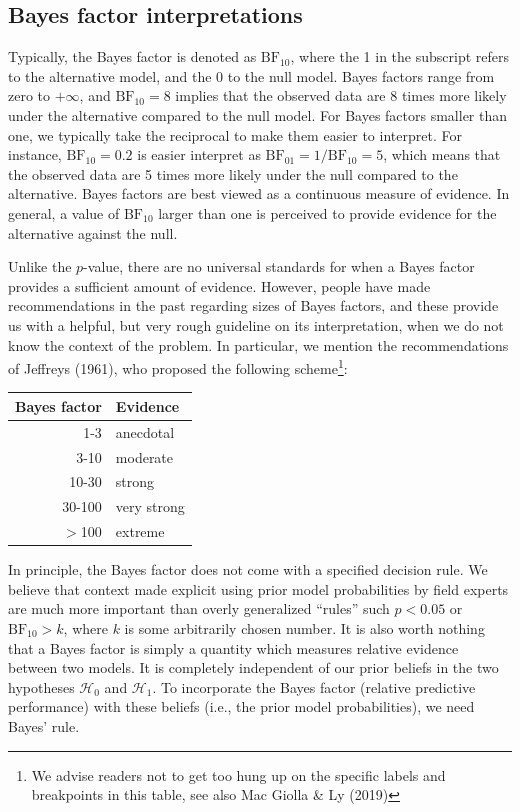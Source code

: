 \documentclass[english,,doc,floatsintext]{apa6}
\let\rmarkdownfootnote\footnote%
\def\footnote{\protect\rmarkdownfootnote}
\begin{document}
\hypertarget{bayes-factor-interpretations}{%
\subsection{Bayes factor interpretations}\label{bayes-factor-interpretations}}

Typically, the Bayes factor is denoted as \(\text{BF}_{10}\), where the 1 in the subscript refers to the alternative model, and the 0 to the null model. Bayes factors range from zero to \(+ \infty\), and \(\text{BF}_{10} = 8\) implies that the observed data are 8 times more likely under the alternative compared to the null model. For Bayes factors smaller than one, we typically take the reciprocal to make them easier to interpret. For instance, \(\text{BF}_{10} = 0.2\) is easier interpret as \(\text{BF}_{01} = 1/\text{BF}_{10} = 5\), which means that the observed data are 5 times more likely under the null compared to the alternative. Bayes factors are best viewed as a continuous measure of evidence. In general, a value of \(\text{BF}_{10}\) larger than one is perceived to provide evidence for the alternative against the null.

Unlike the \(p\)-value, there are no universal standards for when a Bayes factor provides a sufficient amount of evidence. However, people have made recommendations in the past regarding sizes of Bayes factors, and these provide us with a helpful, but very rough guideline on its interpretation, when we do not know the context of the problem. In particular, we mention the recommendations of Jeffreys (1961), who proposed the following scheme\footnote{We advise readers not to get too hung up on the specific labels and breakpoints in this table, see also Mac Giolla \& Ly (2019)}:

\begin{center}
\begin{tabular}{rl}
Bayes factor & Evidence\\
\hline
1-3 & anecdotal\\
3-10 & moderate\\
10-30 & strong\\
30-100 & very strong\\
\( > \)100 & extreme\\
\end{tabular}
\end{center}

In principle, the Bayes factor does not come with a specified decision rule. We believe that context made explicit using prior model probabilities by field experts are much more important than overly generalized \enquote{rules} such \(p < 0.05\) or \(\text{BF} _{10} > k\), where \(k\) is some arbitrarily chosen number. It is also worth nothing that a Bayes factor is simply a quantity which measures relative evidence between two models. It is completely independent of our prior beliefs in the two hypotheses \(\mathcal{H}_0\) and \(\mathcal{H}_1\). To incorporate the Bayes factor (relative predictive performance) with these beliefs (i.e., the prior model probabilities), we need Bayes' rule.
\end{document}
